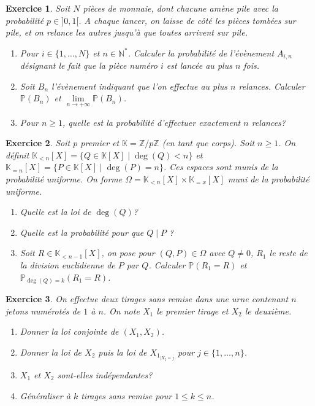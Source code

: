 \documentclass[12pt]{article}
\newtheorem{exercise}{Exercice}[section]
\theoremstyle{remark}
\theoremstyle{remark}
\newcommand{\K}{\mathbb{K}} \newcommand{\R}{\mathbb{R}}
\newcommand{\N}{\mathbb{N}} \newcommand{\Z}{\mathbb{Z}}
\renewcommand{\P}{\mathbb{P}} \newcommand{\im}{\emph{Im}}
\begin{document}
\begin{exercise}
	Soit $N$ pièces de monnaie, dont chacune amène pile avec la probabilité
	$p\in]0,1[$. A chaque lancer, on laisse de côté les pièces tombées sur pile,
	et on relance les autres jusqu'à que toutes arrivent sur pile.
	\begin{enumerate}
		\item
		Pour $i\in\{1,\dots,N\}$ et $n\in\N^{*}$. Calculer la probabilité de
		l'évènement $A_{i,n}$ désignant le fait que la pièce numéro $i$ est lancée
		au plus $n$ fois.
		\item
		Soit $B_{n}$ l'évènement indiquant que l'on effectue au plus $n$ relances.
		Calculer $\P(B_{n})$ et $\lim\limits_{n\to+\infty}\P(B_{n})$.
		\item
		Pour $n\geqslant1$, quelle est la probabilité d'effectuer exactement $n$
		relances?
	\end{enumerate}
\end{exercise}

\begin{exercise}
	Soit $p$ premier et $\K=\Z/p\Z$ (en tant que corps). Soit $n\geqslant1$. On
	définit $\K_{<n}[X]=\{Q\in\K[X]\mid \deg(Q)<n\}$ et
	$\K_{=n}[X]=\{P\in\K[X]\mid \deg(P)=n\}$. Ces espaces sont munis de la
	probabilité uniforme. On forme $\Omega=\K_{<n}[X]\times\K_{=x}[X]$ muni de la
	probabilité uniforme.
	\begin{enumerate}
		\item
		Quelle est la loi de $\deg(Q)$?
		\item
		Quelle est la probabilité pour que $Q\mid P$ ?
		\item
		Soit $R\in\K_{<n-1}[X]$, on pose pour $(Q,P)\in\Omega$ avec $Q\neq0$,
		$R_{1}$ le reste de la division euclidienne de $P$ par $Q$. Calculer
		$\P(R_{1}=R)$ et $\P_{\deg(Q)=k}(R_{1}=R)$.
	\end{enumerate}
\end{exercise}

\begin{exercise}
	On effectue deux tirages sans remise dans une urne contenant $n$ jetons
	numérotés de $1$ à $n$. On note $X_{1}$ le premier tirage et $X_{2}$ le
	deuxième.
	\begin{enumerate}
		\item
		Donner la loi conjointe de $(X_{1},X_{2})$.
		\item
		Donner la loi de $X_{2}$ puis la loi de $X_{{1}_{\mid X_{2}=j}}$ pour
		$j\in\{1,\dots,n\}$.
		\item
		$X_{1}$ et $X_{2}$ sont-elles indépendantes?
		\item
		Généraliser à $k$ tirages sans remise pour $1\leqslant k\leqslant n$.
	\end{enumerate}
\end{exercise}
\end{document}

